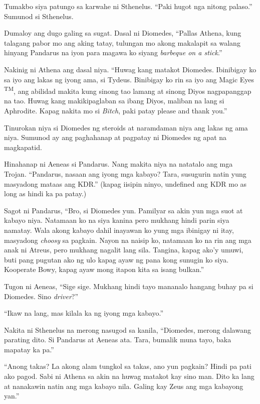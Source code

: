 \documentclass[12pt,letterpaper]{report}
\begin{document}
Tumakbo siya patungo sa karwahe ni Sthenelus. ``Paki hugot nga nitong palaso.'' Sumunod si Sthenelus.

Dumaloy ang dugo galing sa sugat. Dasal ni Diomedes, ``Pallas Athena, kung talagang pabor mo ang aking tatay, tulungan mo akong makalapit sa walang hinyang Pandarus na iyon para magawa ko siyang \textit{barbeque on a stick}.''

Nakinig ni Athena ang dasal niya. ``Huwag kang matakot Diomedes. Ibinibigay ko sa iyo ang lakas ng iyong ama, si Tydeus. Binibigay ko rin sa iyo ang Magic Eyes \textsuperscript{TM}, ang abilidad makita kung sinong tao lamang at sinong Diyos nagpapanggap na tao. Huwag kang makikipaglaban sa ibang Diyos, maliban na lang si Aphrodite. Kapag nakita mo si \textit{Bitch}, paki patay please and thank you.''

Tinurokan niya si Diomedes ng steroids at naramdaman niya ang lakas ng ama niya. Sumunod ay ang paghahanap at pagpatay ni Diomedes ng apat na magkapatid.

Hinahanap ni Aeneas si Pandarus. Nang makita niya na natatalo ang mga Trojan. ``Pandarus, nasaan ang iyong mga kabayo? Tara, susugurin natin yung masyadong mataas ang KDR.'' (kapag iisipin ninyo, undefined ang KDR mo as long as hindi ka pa patay.)

Sagot ni Pandarus, ``Bro, si Diomedes yun. Pamilyar sa akin yun mga suot at kabayo niya. Natamaan ko na siya kanina pero mukhang hindi parin siya namatay. Wala akong kabayo dahil inayawan ko yung mga ibinigay ni itay, masyadong \textit{choosy} sa pagkain. Nayon na naisip ko, natamaan ko na rin ang mga anak ni Atreus, pero mukhang nagalit lang sila. Tangina, kapag ako'y umuwi, buti pang pugutan ako ng ulo kapag ayaw ng pana kong sunugin ko siya. Kooperate Bowy, kapag ayaw mong itapon kita sa isang bulkan.''

Tugon ni Aeneas, ``Sige sige. Mukhang hindi tayo mananalo hangang buhay pa si Diomedes. Sino \textit{driver}?''

``Ikaw na lang, mas kilala ka ng iyong mga kabayo.''

Nakita ni Sthenelus na merong nasugod sa kanila, ``Diomedes, merong dalawang parating dito. Si Pandarus at Aeneas ata. Tara, bumalik muna tayo, baka mapatay ka pa.''

``Anong takas? La akong alam tungkol sa takas, ano yun pagkain? Hindi pa pati ako pagod. Sabi ni Athena sa akin na huwag matakot kay sino man. Dito ka lang at nanakawin natin ang mga kabayo nila. Galing kay Zeus ang mga kabayong yan.''
\end{document}
